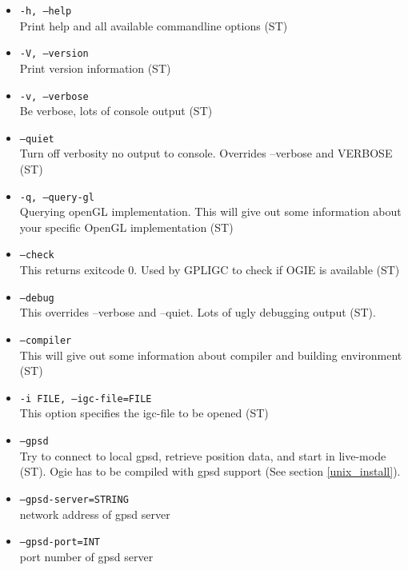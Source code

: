 \begin{itemize}

\item \texttt{-h, --help} \\
Print help and all available commandline options (ST)

\item \texttt{-V, --version} \\
Print version information (ST)

\item \texttt{-v, --verbose} \\
Be verbose, lots of console output (ST)

\item \texttt{--quiet} \\
Turn off verbosity no output to console. Overrides --verbose and VERBOSE (ST)

\item \texttt{-q, --query-gl} \\
Querying openGL implementation. This will give out some information about your specific OpenGL implementation (ST)

\item \texttt{--check} \\
This returns exitcode 0. Used by GPLIGC to check if OGIE is available (ST)

\item \texttt{--debug} \\
This overrides --verbose and --quiet. Lots of ugly debugging output (ST).

\item \texttt{--compiler} \\
This will give out some information about compiler and building environment (ST)

\item \texttt{-i FILE, --igc-file=FILE} \\
This option specifies the igc-file to be opened (ST)

\item \texttt{--gpsd} \\
Try to connect to local gpsd, retrieve position data, and start in live-mode (ST).
Ogie has to be compiled with gpsd support (See section \ref{unix_install}).

\item \texttt{--gpsd-server=STRING} \\
network address of gpsd server

\item \texttt{--gpsd-port=INT} \\
port number of gpsd server



\end{itemize}
